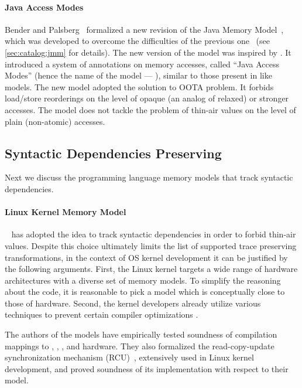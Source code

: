 \paragraph{Java Access Modes}

Bender and Palsberg~\cite{Bender-Palsberg:OOPSLA19} formalized a new revision 
of the Java Memory Model~\cite{JDK9-VarHandle, JEP:193, JDK9-Modes}, 
which was developed to overcome 
the difficulties of the previous one~\cite{Manson-al:POPL05}
(see \ref{sec:catalog:jmm} for details).
The new version of the model was inspired by \RCMM. 
It introduced a system of annotations on memory accesses, 
called ``Java Access Modes'' (hence the name of the model --- \JAM),
similar to those present in \CMM like models.
The new model adopted the \RCMM solution to OOTA problem. 
It forbids load/store reorderings on the level of 
opaque (an analog of \CPP relaxed) or stronger accesses.
The model does not tackle the problem of 
thin-air values on the level of plain (\ie non-atomic) accesses.

\subsection{Syntactic Dependencies Preserving}
\label{sec:catalog:deprf}

Next we discuss the programming language memory models 
that track syntactic dependencies.

\paragraph{Linux Kernel Memory Model}

\LKMM~\cite{Alglave-al:ASPLOS18} has adopted 
the idea to track syntactic dependencies in order to 
forbid thin-air values. Despite this choice 
ultimately limits the list of supported 
trace preserving transformations,
in the context of OS kernel development 
it can be justified by the following arguments. 
First, the Linux kernel targets 
a wide range of hardware architectures with a diverse
set of memory models. To simplify the reasoning about the code, 
it is reasonable to pick a model which is conceptually close
to those of hardware. 
Second, the kernel developers already utilize 
various techniques to prevent certain compiler optimizations%
\cite{Alglave-al:ASPLOS18, LK-MemBarriers, LK-RCU-Deref}.

The authors of the models have empirically tested 
soundness of compilation mappings to 
\Intel, , , and \POWER hardware. 
They also formalized the read-copy-update 
synchronization mechanism (RCU)~\cite{McKenney-RCU2007}, 
extensively used in Linux kernel development, 
and proved soundness of its implementation with respect to their model.

